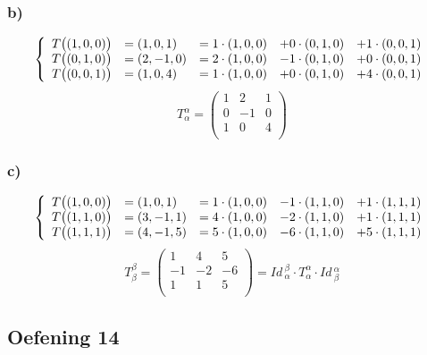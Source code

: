 \documentclass[lineaire_algebra_oplossingen.tex]{subfiles}
\begin{document}
\subsubsection*{b)}
\[
\left\lbrace
\begin{array}{c l c c c}
T\big((1,0,0)\big) &= (1,0,1) &= 1\cdot (1,0,0) &+ 0\cdot (0,1,0) &+ 1\cdot (0,0,1) \\
T\big((0,1,0)\big) &= (2,-1,0)&= 2\cdot (1,0,0) &- 1\cdot (0,1,0) &+ 0\cdot (0,0,1)\\
T\big((0,0,1)\big) &= (1,0,4) &= 1\cdot (1,0,0) &+ 0\cdot (0,1,0) &+ 4\cdot (0,0,1)\\ 
\end{array}
\right.
\]
\[
T_\alpha^\alpha = 
\begin{pmatrix}
1 & 2 & 1\\
0 & -1 & 0\\
1 & 0 & 4\\
\end{pmatrix}
\]

\subsubsection*{c)}
\[
\left\lbrace
\begin{array}{c l c c c}
T\big((1,0,0)\big) &= (1,0,1) &= 1\cdot (1,0,0) &- 1\cdot (1,1,0) &+ 1\cdot (1,1,1)\\
T\big((1,1,0)\big) &= (3,-1,1)&= 4\cdot (1,0,0) &- 2\cdot (1,1,0) &+ 1\cdot (1,1,1)\\
T\big((1,1,1)\big) &= (4,-1,5)&= 5\cdot (1,0,0) &- 6\cdot (1,1,0) &+ 5\cdot (1,1,1)\\
\end{array}
\right.
\]
\[
T_\beta^\beta = 
\begin{pmatrix}
1 & 4 & 5\\
-1 & -2 & -6\\
1 & 1 & 5\\
\end{pmatrix}
= \textit{Id}\,_\alpha^\beta \cdot T_\alpha^\alpha \cdot \textit{Id}\,_\beta^\alpha
\]

\subsection{Oefening 14}
\end{document}
